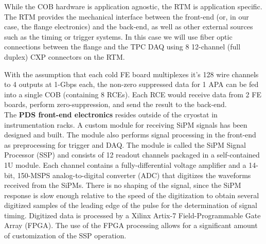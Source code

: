 While the COB hardware is application agnostic, the RTM is application specific.
The RTM provides the mechanical interface between the front-end (or, in our case, the flange electronics)
and the back-end, as well as other external sources such as the timing or trigger systems.
In this case we will use fiber optic connections between the flange and the TPC DAQ using 8 12-channel (full duplex)
CXP connectors on the RTM. 

With the assumption that each cold FE board multiplexes it's 128 wire channels to 4 outputs at 1-Gbps each,
the non-zero suppressed data for 1 APA can be fed into a single COB (containing 8 RCEs).
Each RCE would receive data from 2 FE boards, perform zero-suppression, and send the result to the back-end.  \\


The {\bf PDS front-end electronics} resides outside of the cryostat in
instrumentation racks. A custom module for receiving SiPM signals has
been designed and built. The module also performs signal processing in
the front-end as preprocessing for trigger and DAQ.  The module is
called the SiPM Signal Processor (SSP) and consists of 12 readout
channels packaged in a self-contained 1U module.  Each channel
contains a fully-differential voltage amplifier and a 14-bit, 150-MSPS
analog-to-digital converter (ADC) that digitizes the waveforms
received from the SiPMs. There is no shaping of the signal, since the
SiPM response is slow enough relative to the speed of the digitization
to obtain several digitized samples of the leading edge of the pulse
for the determination of signal timing. Digitized data is processed by
a Xilinx Artix-7 Field-Programmable Gate Array (FPGA).  The use of the
FPGA processing allows for a significant amount of customization of
the SSP operation. \\






